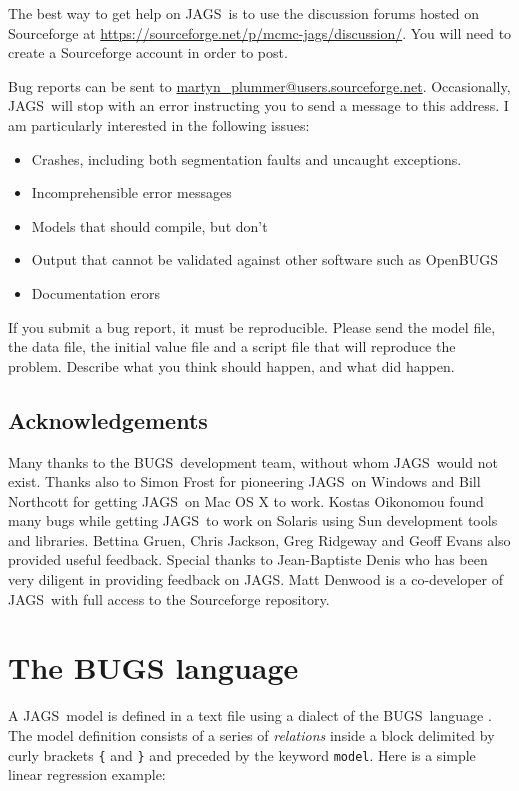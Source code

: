 \documentclass[11pt, a4paper, titlepage]{report}
\newcommand{\JAGS}{\textsf{JAGS}}
\newcommand{\BUGS}{\textsf{BUGS}}
\newcommand{\OpenBUGS}{\textsf{OpenBUGS}}
\begin{document}
The best way to get help on \JAGS\ is to use the discussion forums
hosted on Sourceforge at
\url{https://sourceforge.net/p/mcmc-jags/discussion/}.  You will need
to create a Sourceforge account in order to post.

Bug reports can be sent to \url{martyn_plummer@users.sourceforge.net}.
Occasionally, \JAGS\ will stop with an error instructing you to send a
message to this address. I am particularly interested in the following
issues:
\begin{itemize}
\item Crashes, including both segmentation faults and uncaught exceptions.
\item Incomprehensible error messages
\item Models that should compile, but don't 
\item Output that cannot be validated against other software such as
  \OpenBUGS
\item Documentation erors
\end{itemize}

If you submit a bug report, it must be reproducible. Please send the
model file, the data file, the initial value file and a script file
that will reproduce the problem. Describe what you think should
happen, and what did happen.

\section{Acknowledgements}

Many thanks to the \BUGS\ development team, without whom \JAGS\ would
not exist.  Thanks also to Simon Frost for pioneering \JAGS\ on
Windows and Bill Northcott for getting \JAGS\ on Mac OS X to
work. Kostas Oikonomou found many bugs while getting \JAGS\ to work on
Solaris using Sun development tools and libraries.  Bettina Gruen,
Chris Jackson, Greg Ridgeway and Geoff Evans also provided useful
feedback.  Special thanks to Jean-Baptiste Denis who has been very
diligent in providing feedback on JAGS. Matt Denwood is a co-developer
of \JAGS\ with full access to the Sourceforge repository.

\chapter{The BUGS language}
\label{chapter:bugslang}

A \JAGS\ model is defined in a text file using a dialect of the
\BUGS\ language \citep{LunnEtal2012}.  The model definition consists
of a series of {\em relations} inside a block delimited by curly brackets
\verb+{+ and \verb+}+ and preceded by the keyword \verb+model+. Here
is a simple linear regression example:
\end{document}
